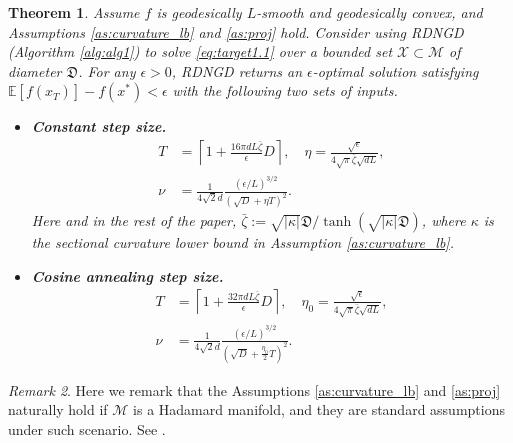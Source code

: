 \documentclass{article}
\newcommand{\pert}{\nu}
\theoremstyle{plain}
\newtheorem{theorem}{Theorem}[section]
\theoremstyle{definition}
\theoremstyle{remark}
\newtheorem{remark}[theorem]{Remark}
\begin{document}
\begin{theorem}\label{thm:beta_smoothness_convex_complexityapp}
Assume $f$ is geodesically $L$-smooth and geodesically convex, and Assumptions \ref{as:curvature_lb} and \ref{as:proj} hold. Consider using RDNGD (Algorithm \ref{alg:alg1}) to solve \eqref{eq:target1.1} over a bounded set $\mathcal{X}\subset\mathcal{M}$ of diameter $\mathfrak{D}$. For any $\epsilon>0$, RDNGD returns an $\epsilon$-optimal solution satisfying $\mathbb{E}[f(\hat{x}_{T})] - f(x^*) < \epsilon$ with the following two sets of inputs.
\begin{itemize}[leftmargin=*]
\item[(i)] \textbf{Constant step size.}
\begin{equation}\label{thm:beta_smoothness_convex_complexityapp-constant-step-param}
\begin{split}
    T &= \left\lceil1+\frac{16\pi d{L}\bar{\zeta}}{\epsilon}D\right\rceil, \quad 
    \eta =\frac{\sqrt{\epsilon}}{4\sqrt{\pi}\bar{\zeta}\sqrt{d{L}}}, \\
    \pert &= \frac{1}{4\sqrt{2} d}\frac{(\epsilon/{L})^{3/2}}{(\sqrt{D}+\eta T)^2}.
\end{split}
\end{equation}
Here and in the rest of the paper, $\bar{\zeta} :=  {\sqrt{|\kappa|}\mathfrak{D}}/{\tanh(\sqrt{|\kappa|} \mathfrak{D})}$, where $\kappa$ is the sectional curvature lower bound in Assumption \ref{as:curvature_lb}.

\item[(ii)] \textbf{Cosine annealing step size.}
\begin{equation}\label{thm:beta_smoothness_convex_complexityapp-cosine-step-param}
\begin{split}
    T &= \left\lceil 1 + \frac{32\pi d{L}\bar{\zeta}}{\epsilon}D \right\rceil, \quad 
    \eta_0 = \frac{\sqrt{\epsilon}}{4\sqrt{\pi}\bar{\zeta}\sqrt{d{L}}}, \\
    \pert &= \frac{1}{4\sqrt{2} d}\frac{(\epsilon/{L})^{3/2}}{(\sqrt{D}+\frac{\eta_0}{2}T)^2}.
\end{split}
\end{equation}
\end{itemize}
\end{theorem}


\begin{remark}
Here we remark that the Assumptions \ref{as:curvature_lb} and \ref{as:proj} naturally hold if $\mathcal{M}$ is a Hadamard manifold, and they are standard assumptions under such scenario. See \citep{Bacak2014Hadamard,zhang2016firstordermethodsgeodesicallyconvex, li2024zeroth}.
\end{remark}
\end{document}
